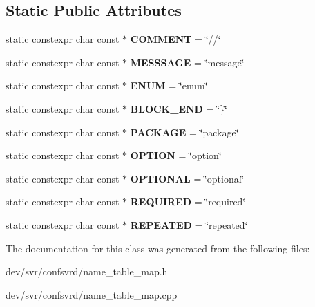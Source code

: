 \subsection*{Static Public Attributes}
\begin{DoxyCompactItemize}
\item 
\hypertarget{classNameTableMap_a5213ae1ca6adcac9db5ed9a85ac7571b}{
static constexpr char const $\ast$ {\bfseries COMMENT} = \char`\"{}//\char`\"{}}
\label{classNameTableMap_a5213ae1ca6adcac9db5ed9a85ac7571b}

\item 
\hypertarget{classNameTableMap_aeae4435f4262bc70922885bf97f69acd}{
static constexpr char const $\ast$ {\bfseries MESSSAGE} = \char`\"{}message\char`\"{}}
\label{classNameTableMap_aeae4435f4262bc70922885bf97f69acd}

\item 
\hypertarget{classNameTableMap_af70af21aab87ec51140114a5b0015374}{
static constexpr char const $\ast$ {\bfseries ENUM} = \char`\"{}enum\char`\"{}}
\label{classNameTableMap_af70af21aab87ec51140114a5b0015374}

\item 
\hypertarget{classNameTableMap_a9470247f1c307822affadfd97c354eac}{
static constexpr char const $\ast$ {\bfseries BLOCK\_\-END} = \char`\"{}\}\char`\"{}}
\label{classNameTableMap_a9470247f1c307822affadfd97c354eac}

\item 
\hypertarget{classNameTableMap_a0852000386dda5fae14734fed43e76af}{
static constexpr char const $\ast$ {\bfseries PACKAGE} = \char`\"{}package\char`\"{}}
\label{classNameTableMap_a0852000386dda5fae14734fed43e76af}

\item 
\hypertarget{classNameTableMap_a6e1096194e68e7f8b5a8095c32727dbb}{
static constexpr char const $\ast$ {\bfseries OPTION} = \char`\"{}option\char`\"{}}
\label{classNameTableMap_a6e1096194e68e7f8b5a8095c32727dbb}

\item 
\hypertarget{classNameTableMap_a0f6d51a6a8030679ac0fa10bfb482b95}{
static constexpr char const $\ast$ {\bfseries OPTIONAL} = \char`\"{}optional\char`\"{}}
\label{classNameTableMap_a0f6d51a6a8030679ac0fa10bfb482b95}

\item 
\hypertarget{classNameTableMap_a7ecb0b9c2b08a1ed0a814e922366917b}{
static constexpr char const $\ast$ {\bfseries REQUIRED} = \char`\"{}required\char`\"{}}
\label{classNameTableMap_a7ecb0b9c2b08a1ed0a814e922366917b}

\item 
\hypertarget{classNameTableMap_a946e7f7c94113ab0425d7838977051ac}{
static constexpr char const $\ast$ {\bfseries REPEATED} = \char`\"{}repeated\char`\"{}}
\label{classNameTableMap_a946e7f7c94113ab0425d7838977051ac}

\end{DoxyCompactItemize}


The documentation for this class was generated from the following files:\begin{DoxyCompactItemize}
\item 
dev/svr/confsvrd/name\_\-table\_\-map.h\item 
dev/svr/confsvrd/name\_\-table\_\-map.cpp\end{DoxyCompactItemize}
